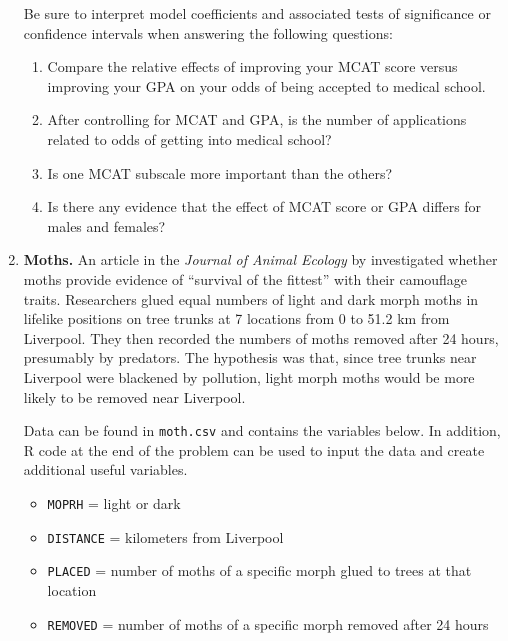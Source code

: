 \documentclass[
]{krantz}
\providecommand{\tightlist}{%
  \setlength{\itemsep}{0pt}\setlength{\parskip}{0pt}}
\begin{document}
\begin{enumerate}
  Be sure to interpret model coefficients and associated tests of significance or confidence intervals when answering the following questions:

  \begin{enumerate}
  \def\labelenumii{\alph{enumii}.}
  \tightlist
  \item
    Compare the relative effects of improving your MCAT score versus improving your GPA on your odds of being accepted to medical school.
  \item
    After controlling for MCAT and GPA, is the number of applications related to odds of getting into medical school?
  \item
    Is one MCAT subscale more important than the others?
  \item
    Is there any evidence that the effect of MCAT score or GPA differs for males and females?
  \end{enumerate}
\item
  \textbf{Moths.} An article in the \emph{Journal of Animal Ecology} by \citet{Bishop1972} investigated whether moths provide evidence of ``survival of the fittest'' with their camouflage traits. Researchers glued equal numbers of light and dark morph moths in lifelike positions on tree trunks at 7 locations from 0 to 51.2 km from Liverpool. They then recorded the numbers of moths removed after 24 hours, presumably by predators. The hypothesis was that, since tree trunks near Liverpool were blackened by pollution, light morph moths would be more likely to be removed near Liverpool.

  Data \citep{Ramsey2002} can be found in \texttt{moth.csv} and contains the variables below. In addition, R code at the end of the problem can be used to input the data and create additional useful variables.

  \begin{itemize}
  \tightlist
  \item
    \texttt{MOPRH} = light or dark
  \item
    \texttt{DISTANCE} = kilometers from Liverpool
  \item
    \texttt{PLACED} = number of moths of a specific morph glued to trees at that location
  \item
    \texttt{REMOVED} = number of moths of a specific morph removed after 24 hours
  \end{itemize}


\end{enumerate}
\end{document}
